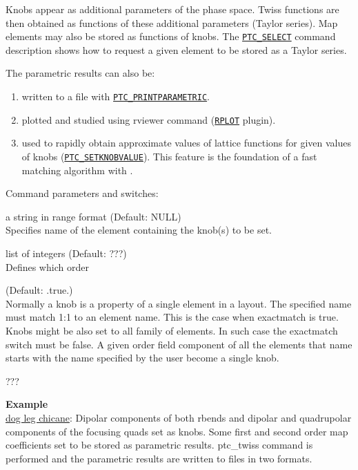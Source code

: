 Knobs appear as additional parameters of the phase space. Twiss
functions are then obtained as functions of these additional parameters
(Taylor series).  
Map elements may also be stored as functions of knobs. 
The \hyperref[sec:ptc-select]{\texttt{PTC\_SELECT}} command 
description shows how to request a given element to be stored as a 
Taylor series.  

The parametric results can also be: 
\begin{enumerate}
   \item  written to a file with
     \hyperref[sec:ptc-printparametric]{\texttt{PTC\_PRINTPARAMETRIC}}. 
   \item  plotted and studied using rviewer command
     (\hyperref[sec:rplot]{\texttt{RPLOT}} plugin). 
   \item  used to rapidly obtain approximate values of lattice
     functions for given values of knobs
     (\hyperref[sec:ptc-setknobvalue]{\texttt{PTC\_SETKNOBVALUE}}). This
     feature is the foundation of a fast matching algorithm with \ptc.      
\end{enumerate}


Command parameters and switches:
\begin{madlist}
    a string in range format (Default: NULL)\\
     Specifies name of the element containing the knob(s) to be set.   

    list of integers (Default: ???)\\
     Defines which order 

    (Default: .true.)\\
     Normally a knob is a property of a single element in a layout.
     The specified name must match 1:1 to an element name. This is the
     case when exactmatch is true.\\  
     Knobs might be also set to all family of elements. In such case
     the exactmatch switch must be false. A given order field
     component of all the elements that name starts with the
     name specified by the user become a single knob.

    ??? 
\end{madlist}


\textbf{Example}\\
\href{http://cern.ch/frs/mad-X_examples/ptc_madx_interface/knobs/knobs.madx}{dog
leg chicane}: Dipolar components of both rbends and dipolar and
quadrupolar components of the focusing quads set as knobs. Some first
and second order map coefficients set to be stored as parametric
results. ptc\_twiss command is performed and the parametric results are
written to files in two formats. 

